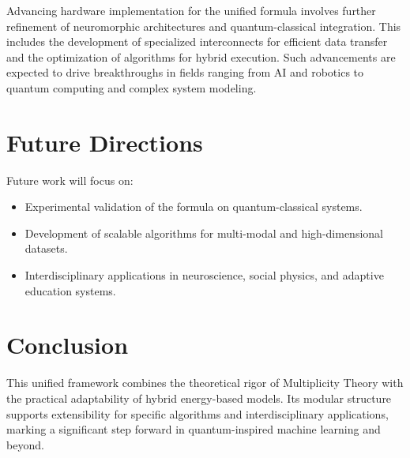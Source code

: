 \documentclass{article}
\theoremstyle{plain}
\begin{document}
Advancing hardware implementation for the unified formula involves further refinement of neuromorphic architectures and quantum-classical integration. This includes the development of specialized interconnects for efficient data transfer and the optimization of algorithms for hybrid execution. Such advancements are expected to drive breakthroughs in fields ranging from AI and robotics to quantum computing and complex system modeling.


\section{Future Directions}
Future work will focus on:
\begin{itemize}
    \item Experimental validation of the formula on quantum-classical systems.
    \item Development of scalable algorithms for multi-modal and high-dimensional datasets.
    \item Interdisciplinary applications in neuroscience, social physics, and adaptive education systems.
\end{itemize}

\section{Conclusion}
This unified framework combines the theoretical rigor of Multiplicity Theory with the practical adaptability of hybrid energy-based models. Its modular structure supports extensibility for specific algorithms and interdisciplinary applications, marking a significant step forward in quantum-inspired machine learning and beyond.



\end{document}
